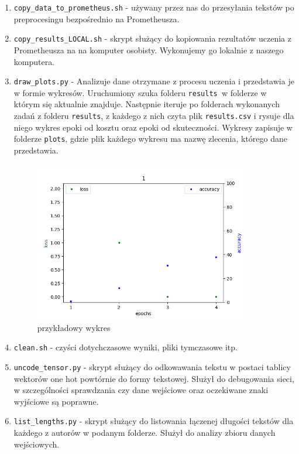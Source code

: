 \begin{enumerate}
	\item {\texttt{copy\_data\_to\_prometheus.sh} } - używany przez nas do przesyłania tekstów po preprocesingu
	bezpośrednio na Prometheusza. 
	
	\item {\texttt{copy\_results\_LOCAL.sh} } - skrypt służący do kopiowania rezultatów uczenia z Prometheusza na 
	na komputer osobisty. Wykonujemy go lokalnie z naszego komputera. 

	\item {\texttt{draw\_plots.py} } - Analizuje dane otrzymane z procesu uczenia i przedstawia je w formie wykresów.
	Uruchumiony szuka folderu \texttt{results }w folderze w którym się aktualnie znajduje. Następnie iteruje po folderach
	wykonanych zadań z folderu \texttt{results}, z każdego z nich czyta plik \texttt{results.csv} i rysuje dla niego wykres epoki od kosztu
 	oraz epoki od skuteczności. Wykresy zapisuje w folderze \texttt{plots}, gdzie plik każdego wykresu ma nazwę 
 	zlecenia, którego dane przedstawia.
 	
 	\begin{figure}[H]
	\centering
	\includegraphics[height=7cm]{./images/plot.png}
	\caption{przykładowy wykres}
	\label{fig:test5}
	\end{figure}
 	
	
	\item {\texttt{clean.sh} } - czyści dotychczasowe wyniki, pliki tymczasowe itp.
	
	\item {\texttt{uncode\_tensor.py} } - skrypt służący do odkowawania tekstu w postaci tablicy wektorów one hot powtórnie do 
 	formy tekstowej. Służył do debugowania sieci, w szczególności sprawdzania czy dane wejściowe oraz 
 	oczekiwane znaki wyjściowe są poprawne.
 	
 	\item {\texttt{list\_lengths.py} } - skrypt służący do listowania łączenej długości tekstów dla każdego z autorów
 	w podanym folderze. Służył do analizy zbioru danych wejściowych.
	
	
	
\end{enumerate}



